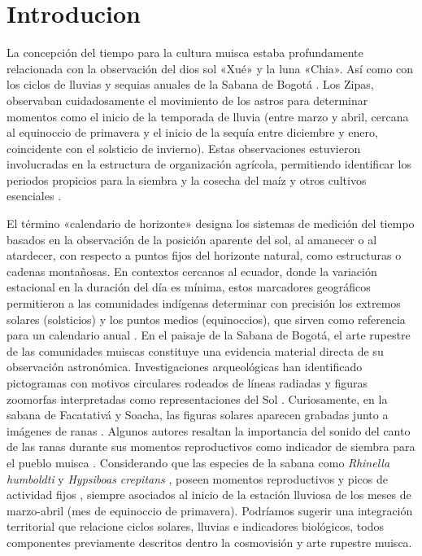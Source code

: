 \documentclass[a4paper,alpha-refs]{eSpectra}
\begin{document}
\section{Introducion}

La concepción del tiempo para la cultura muisca estaba profundamente relacionada con la observación del dios sol «Xué» y la luna «Chia». Así como con los ciclos de lluvias y sequias anuales de la Sabana de Bogotá \cite{langebaek_muiscas_2005}. Los Zipas, observaban cuidadosamente el movimiento de los astros para determinar momentos como el inicio de la temporada de lluvia (entre marzo y abril, cercana al equinoccio de primavera y el inicio de la sequía entre diciembre y enero, coincidente con el solsticio de invierno).  Estas observaciones estuvieron involucradas en la estructura de organización agrícola, permitiendo identificar los periodos propicios para la siembra y la cosecha del maíz y otros cultivos esenciales \cite{duquesne_calendario_acosta_1848}.

El término «calendario de horizonte» designa los sistemas de medición del tiempo basados en la observación de la posición aparente del sol, al amanecer o al atardecer, con respecto a puntos fijos del horizonte natural, como estructuras o cadenas montañosas. En contextos cercanos al ecuador, donde la variación estacional en la duración del día es mínima, estos marcadores geográficos permitieron a las comunidades indígenas determinar con precisión los extremos solares (solsticios) y los puntos medios (equinoccios), que sirven como referencia para un calendario anual \cite{quijano_astronomia_2021}. En el paisaje de la Sabana de Bogotá, el arte rupestre de las comunidades muiscas constituye una evidencia material directa de su observación astronómica. Investigaciones arqueológicas han identificado pictogramas con motivos circulares rodeados de líneas radiadas y figuras zoomorfas interpretadas como representaciones del Sol \cite{munoz_animales_2009, martinez_manual_2004}. Curiosamente, en la sabana de Facatativá y Soacha, las figuras solares aparecen grabadas junto a imágenes de ranas \cite{saenz_cepeda_2020}. Algunos autores resaltan la importancia del sonido del canto de las ranas durante sus momentos reproductivos como indicador de siembra para el pueblo muisca \cite{duquesne_calendario_manuscript_1795}. Considerando que las especies de la sabana como \textit{Rhinella humboldti}  y  \textit{Hypsiboas crepitans} , poseen momentos reproductivos y picos de actividad fijos \cite{cortes_gallo_ecologia_reproductiva_2024}, siempre asociados al inicio de la estación lluviosa de los meses de marzo-abril (mes de equinoccio de primavera). Podríamos sugerir una integración territorial que relacione ciclos solares, lluvias e indicadores biológicos, todos componentes previamente descritos dentro la cosmovisión y arte rupestre muisca. 
\end{document}

